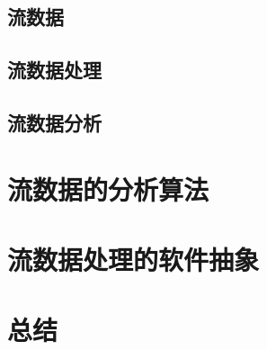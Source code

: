 \documentclass{article}
\begin{document}
\subsection{流数据}

\subsection{流数据处理}

\subsection{流数据分析}







\newpage 
\section{流数据的分析算法}

\newpage 
\section{流数据处理的软件抽象}

\cite{storm-blueprints}
\cite{frontiers-mda}
\cite{mmd}
\cite{dataflow-model}

\newpage 
\section{总结}

\newpage
\renewcommand\refname{参考文献}  

\end{document}
